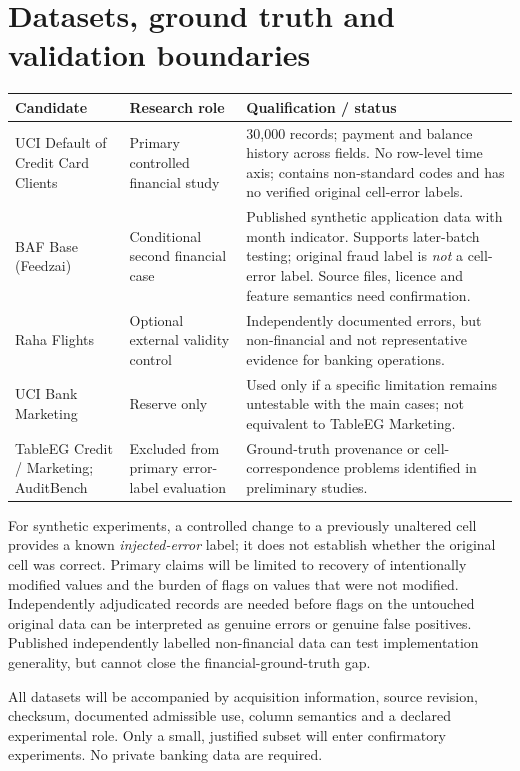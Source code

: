 \documentclass[10pt,a4paper]{article}
\begin{document}
\section{Datasets, ground truth and validation boundaries}
\begin{tabularx}{\linewidth}{@{}P{38mm}P{32mm}Y@{}}
\toprule
\textbf{Candidate} & \textbf{Research role} & \textbf{Qualification / status} \\
\midrule
UCI Default of Credit Card Clients & Primary controlled financial study & 30,000 records; payment and balance history across fields. No row-level time axis; contains non-standard codes and has no verified original cell-error labels. \\
BAF Base (Feedzai) & Conditional second financial case & Published synthetic application data with month indicator. Supports later-batch testing; original fraud label is \emph{not} a cell-error label. Source files, licence and feature semantics need confirmation. \\
Raha Flights & Optional external validity control & Independently documented errors, but non-financial and not representative evidence for banking operations. \\
UCI Bank Marketing & Reserve only & Used only if a specific limitation remains untestable with the main cases; not equivalent to TableEG Marketing. \\
TableEG Credit / Marketing; AuditBench & Excluded from primary error-label evaluation & Ground-truth provenance or cell-correspondence problems identified in preliminary studies. \\
\bottomrule
\end{tabularx}

For synthetic experiments, a controlled change to a previously unaltered cell provides a known \emph{injected-error} label; it does not establish whether the original cell was correct. Primary claims will be limited to recovery of intentionally modified values and the burden of flags on values that were not modified. Independently adjudicated records are needed before flags on the untouched original data can be interpreted as genuine errors or genuine false positives. Published independently labelled non-financial data can test implementation generality, but cannot close the financial-ground-truth gap.

All datasets will be accompanied by acquisition information, source revision, checksum, documented admissible use, column semantics and a declared experimental role. Only a small, justified subset will enter confirmatory experiments. No private banking data are required.
\end{document}
